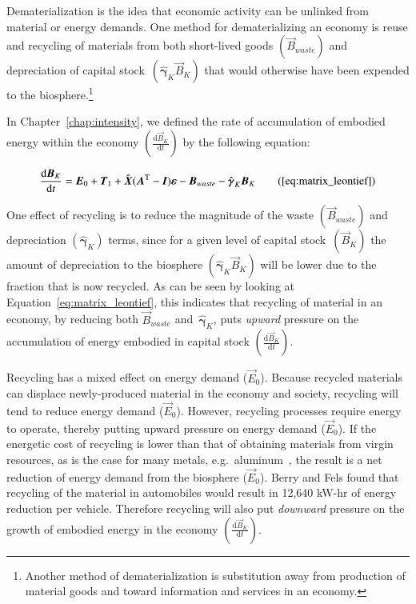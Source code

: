 Dematerialization is the idea that economic activity can be unlinked 
from material or energy demands.\cite{FischerKowalski:2011uo} 
One method for dematerializing an economy 
is reuse and recycling of materials from both
short-lived goods
$\left(\vec{B}_{waste}\right)$
and depreciation of 
capital 
stock~$\left(\hat{\boldsymbol{\gamma}}_{K}\vec{B}_{K}\right)$
that would otherwise have
been expended to the biosphere.\footnote{Another 
method  of dematerialization is 
substitution away from production of material goods 
and toward information and services
in an economy.}

In Chapter~\ref{chap:intensity},
we defined the rate of accumulation 
of embodied energy within the economy
$\left(\frac{\mathrm{d}\vec{B}_{K}}{\mathrm{d}t}\right)$
by the following equation:

\begin{equation}
	\frac{\mathrm{d}\vec{B}_{K}}{\mathrm{d}t} 
	= \vec{E}_{0}
	+ \vec{T}_{1}
	+ \hat{\vec{X}} (\vec{A}^{\mathrm{T}} - \vec{I})\boldsymbol{\varepsilon} 
	- \vec{B}_{waste}
	- \hat{\boldsymbol{\gamma}}_{K}\vec{B}_{K}\tag{\ref{eq:matrix_leontief}}
\end{equation}

One effect of recycling is to reduce the magnitude 
of the waste 
$\left(\vec{B}_{waste}\right)$
and depreciation 
$\left(\hat{\boldsymbol{\gamma}}_{K}\right)$ 
terms,
since for a given level of capital 
stock~$\left(\vec{B}_{K}\right)$
the amount of depreciation to the 
biosphere $\left(\hat{\boldsymbol{\gamma}}_{K}\vec{B}_{K}\right)$
will be lower due to the fraction that
is now recycled.
As can be seen by looking at 
Equation~\ref{eq:matrix_leontief},
this indicates that 
recycling of material in an economy, 
by reducing both $\vec{B}_{waste}$ 
and~$\hat{\boldsymbol{\gamma}}_{K}$, 
puts \emph{upward} pressure on the accumulation of 
energy embodied in capital stock
$\left(\frac{\mathrm{d}\vec{B}_{K}}{\mathrm{d}t}\right)$.

Recycling has a mixed effect on energy demand ($\vec{E}_{0}$). 
Because recycled materials can displace newly-produced material 
in the economy and society, 
recycling will tend to reduce energy demand ($\vec{E}_{0}$). 
However, recycling processes require energy to operate, 
thereby putting upward pressure on energy demand ($\vec{E}_{0}$). 
If the energetic cost of recycling is lower than that of obtaining materials
from virgin resources, as is the case for many metals, 
e.g.\ aluminum~\cite{Chapman1975}, 
the result is a net reduction of energy demand 
from the biosphere ($\vec{E}_{0}$). 
Berry and Fels found that recycling of the material in automobiles
would result in 12,640 kW-hr of energy reduction per vehicle.\cite[p. 15]{Berry:1973vo}
Therefore recycling will also put \emph{downward} pressure on 
the growth of embodied energy in the economy
$\left(\frac{\mathrm{d}\vec{B}_{K}}{\mathrm{d}t}\right)$. 

